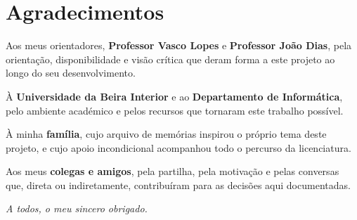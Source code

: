 \chapter*{Agradecimentos}

Aos meus orientadores, \textbf{Professor Vasco Lopes} e \textbf{Professor
João Dias}, pela orientação, disponibilidade e visão crítica que deram
forma a este projeto ao longo do seu desenvolvimento.

À \textbf{Universidade da Beira Interior} e ao \textbf{Departamento de
Informática}, pelo ambiente académico e pelos recursos que tornaram este
trabalho possível.

À minha \textbf{família}, cujo arquivo de memórias inspirou o próprio
tema deste projeto, e cujo apoio incondicional acompanhou todo o percurso
da licenciatura.

Aos meus \textbf{colegas e amigos}, pela partilha, pela motivação e pelas
conversas que, direta ou indiretamente, contribuíram para as decisões
aqui documentadas.

\vspace{1cm}
\begin{flushright}
\textit{A todos, o meu sincero obrigado.}
\end{flushright}
